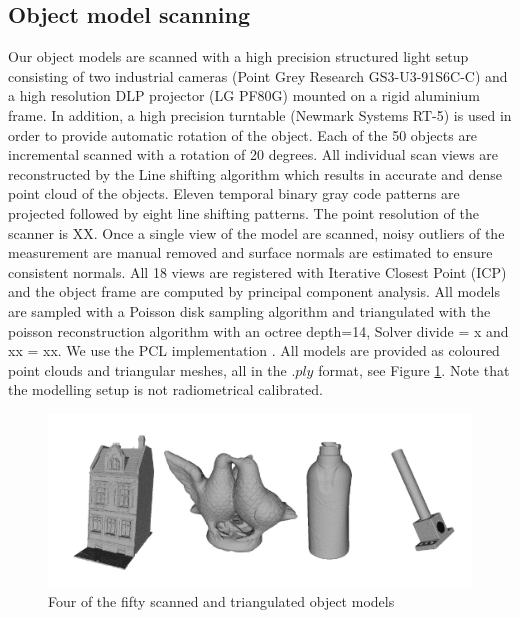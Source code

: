 \documentclass[10pt,twocolumn,letterpaper]{article}
\begin{document}
\subsection{Object model scanning}
Our object models are scanned with a high precision structured light setup consisting of two industrial cameras (Point Grey Research GS3-U3-91S6C-C) and
a high resolution DLP projector (LG PF80G) mounted on a rigid aluminium frame. In addition, a high precision turntable (Newmark Systems RT-5) is used in order to provide automatic rotation of the object. Each of the 50 objects are incremental scanned with a rotation of 20 degrees. All individual scan views are reconstructed by the Line shifting algorithm \cite{Guehring2000} which results in accurate and dense point cloud of the objects. Eleven temporal binary gray code patterns are projected followed by eight line shifting patterns. The point resolution of the scanner is XX. Once a single view of the model are scanned, noisy outliers of the measurement are manual removed and surface normals are estimated to ensure consistent normals. All 18 views are registered with Iterative Closest Point (ICP) and the object frame are computed by principal component analysis.
All models are sampled with a Poisson disk sampling algorithm and triangulated with the poisson reconstruction algorithm \cite{Kazhdan2006} with an octree depth=14, Solver divide = x and xx = xx. We use the PCL implementation \cite{RusuCousins2011}. All models are provided as coloured point clouds and triangular meshes, all in the $.ply$ format, see Figure \ref{fig:objects}. Note that the modelling setup is not radiometrical calibrated.
\begin{figure}[ht]
\centering
\includegraphics[width=1.0\linewidth, height= 1.0\linewidth, keepaspectratio]{img/objects/objects.pdf}
\caption{Four of the fifty scanned and triangulated object models}
\label{fig:objects}
\end{figure}
\end{document}
